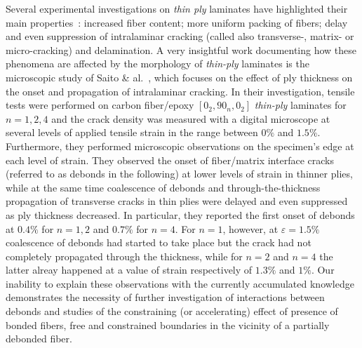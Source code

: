 Several experimental investigations on \emph{thin ply} laminates have highlighted their main properties~\cite{Sasayama2003,Sihn2007,Yokozeki2008,Yokozeki2010,Arteiro2014,Amacher2014,Cugnoni2018}: increased fiber content; more uniform packing of fibers; delay and even suppression of intralaminar cracking (called also transverse-, matrix- or micro-cracking) and delamination. A very insightful work documenting how these phenomena are affected by the morphology of \emph{thin-ply} laminates is the microscopic study of Saito \& al.~\cite{Saito2012}, which focuses on the effect of ply thickness on the onset and propagation of intralaminar cracking. In their investigation, tensile tests were performed on carbon fiber/epoxy $\left[0_{2},90_{n},0_{2}\right]$ \emph{thin-ply} laminates for $n=1,2,4$ and the crack density was measured with a digital microscope at several levels of applied tensile strain in the range between $0\%$ and $1.5\%$. Furthermore, they performed microscopic observations on the specimen's edge at each level of strain. They observed the onset of fiber/matrix interface cracks (referred to as debonds in the following) at lower levels of strain in thinner plies, while at the same time coalescence of debonds and through-the-thickness propagation of transverse cracks in thin plies were delayed and even suppressed as ply thickness decreased. In particular, they reported the first onset of debonds at $0.4\%$ for $n=1,2$ and $0.7\%$ for $n=4$. For $n=1$, however, at $\varepsilon=1.5\%$ coalescence of debonds had started to take place but the crack had not completely propagated through the thickness, while for $n=2$ and $n=4$ the latter alreay happened at a value of strain respectively of $1.3\%$ and $1\%$. Our inability to explain these observations with the currently accumulated knowledge demonstrates the necessity of further investigation of interactions between debonds and studies of the constraining (or accelerating) effect of presence of bonded fibers, free and constrained boundaries in the vicinity of a partially debonded fiber.\\
